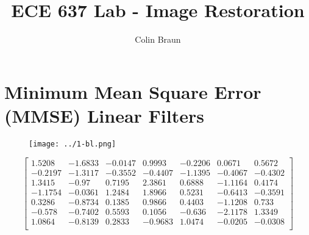 \documentclass{article}
\title{ECE 637 Lab - Image Restoration}
\author{Colin Braun}
\begin{document}
\maketitle

\section{Minimum Mean Square Error (MMSE) Linear Filters}
\begin{figure}[H]
    \centering
    \texttt{[image: ../1-bl.png]}
\end{figure}

\begin{equation*}
\begin{bmatrix}
  1.5208 & -1.6833 & -0.0147 & 0.9993 & -0.2206 & 0.0671 & 0.5672\\
  -0.2197 & -1.3117 & -0.3552 & -0.4407 & -1.1395 & -0.4067 & -0.4302\\
  1.3415 & -0.97 & 0.7195 & 2.3861 & 0.6888 & -1.1164 & 0.4174\\
  -1.1754 & -0.0361 & 1.2484 & 1.8966 & 0.5231 & -0.6413 & -0.3591\\
  0.3286 & -0.8734 & 0.1385 & 0.9866 & 0.4403 & -1.1208 & 0.733\\
  -0.578 & -0.7402 & 0.5593 & 0.1056 & -0.636 & -2.1178 & 1.3349\\
  1.0864 & -0.8139 & 0.2833 & -0.9683 & 1.0474 & -0.0205 & -0.0308\\
\end{bmatrix}
\end{equation*}
\end{document}

